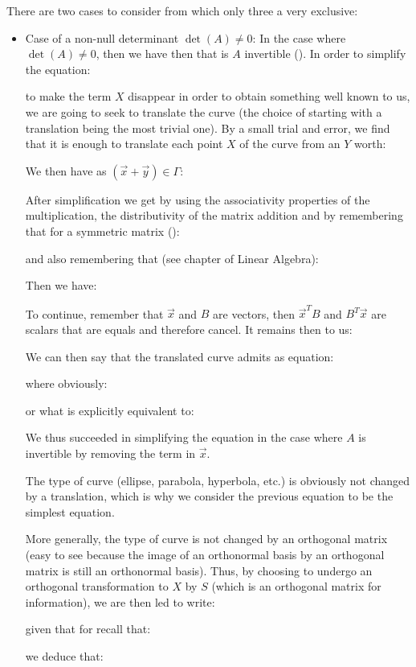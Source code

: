 	There are two cases to consider from which only three a very exclusive:
	\begin{itemize}
		\item Case of a non-null determinant $\det(A)\neq 0$:
		In the case where $\det(A)\neq 0$, then we have then that is $A$ invertible (). In order to simplify the equation:
		
	 	to make the term $X$ disappear in order to obtain something well known to us, we are going to seek to translate the curve (the choice of starting with a translation being the most trivial one). By a small trial and error, we find that it is enough to translate each point $X$ of the curve from an $Y$ worth:
		
		We then have as $(\vec{x}+\vec{y})\in \Gamma$:
		
	 	After simplification we get by using the associativity properties of the multiplication, the distributivity of the matrix addition and by remembering that for a symmetric matrix ():
		
		and also remembering that (see chapter of Linear Algebra):
		
		Then we have:
		
		To continue, remember that $\vec{x}$ and $B$ are vectors, then $\vec{x}^TB$ and $B^T\vec{x}$ are scalars that are equals and therefore cancel. It remains then to us:
		
		We can then say that the translated curve admits as equation:
	
	where obviously:
	
 	or what is explicitly equivalent to:
	
	We thus succeeded in simplifying the equation in the case where $A$ is invertible by removing the term in $\vec{x}$.

	The type of curve (ellipse, parabola, hyperbola, etc.) is obviously not changed by a translation, which is why we consider the previous equation to be the simplest equation.

	More generally, the type of curve is not changed by an orthogonal matrix (easy to see because the image of an orthonormal basis by an orthogonal matrix is still an orthonormal basis). Thus, by choosing to undergo an orthogonal transformation to $X$ by $S$ (which is an orthogonal matrix for information), we are then led to write:
	
	given that for recall that:
	
 	we deduce that:
	

\end{itemize}

